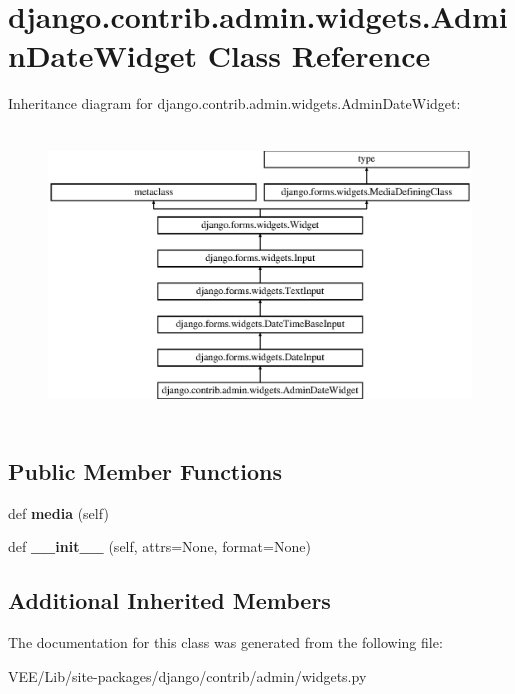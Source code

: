 \hypertarget{classdjango_1_1contrib_1_1admin_1_1widgets_1_1_admin_date_widget}{}\section{django.\+contrib.\+admin.\+widgets.\+Admin\+Date\+Widget Class Reference}
\label{classdjango_1_1contrib_1_1admin_1_1widgets_1_1_admin_date_widget}
Inheritance diagram for django.\+contrib.\+admin.\+widgets.\+Admin\+Date\+Widget\+:\begin{figure}[H]
\begin{center}
\leavevmode
\includegraphics[height=7.804878cm]{classdjango_1_1contrib_1_1admin_1_1widgets_1_1_admin_date_widget}
\end{center}
\end{figure}
\subsection*{Public Member Functions}
\begin{DoxyCompactItemize}
\item 
\mbox{\label{classdjango_1_1contrib_1_1admin_1_1widgets_1_1_admin_date_widget_afcb3d8c668b7fc76c256ac75cd5e97e2}} 
def {\bfseries media} (self)
\item 
\mbox{\label{classdjango_1_1contrib_1_1admin_1_1widgets_1_1_admin_date_widget_a440bf7a43498a9bdf4aac9eb298a95a1}} 
def {\bfseries \+\_\+\+\_\+init\+\_\+\+\_\+} (self, attrs=None, format=None)
\end{DoxyCompactItemize}
\subsection*{Additional Inherited Members}


The documentation for this class was generated from the following file\+:\begin{DoxyCompactItemize}
\item 
V\+E\+E/\+Lib/site-\/packages/django/contrib/admin/widgets.\+py\end{DoxyCompactItemize}
